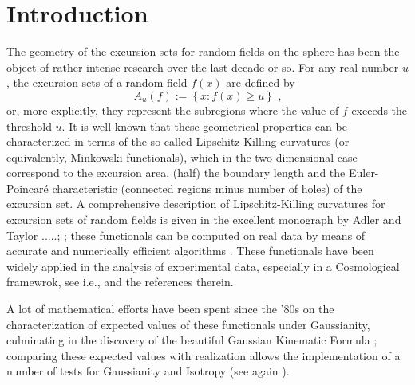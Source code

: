 \documentclass[aps,prd,showpacs,superscriptaddress,groupedaddress]{revtex4-1}  %
\begin{document}
\section{Introduction}

The geometry of the excursion sets for random fields on the sphere has been the object of rather intense research over the last decade or so. For any real number $u$, the excursion sets of a random field $f(x)$ are defined by%
\begin{equation}
A_{u}(f):=\left\{ x:f(x) \geq u\right\} \text{ ,}
\end{equation}
or, more explicitly, they represent the subregions where the value of $f$ exceeds the threshold $u$. It is well-known that these geometrical properties can be characterized in terms of the so-called Lipschitz-Killing curvatures (or equivalently, Minkowski functionals), which in the two dimensional case correspond to the excursion area, (half) the boundary length and the Euler-Poincar\'e characteristic (connected regions minus number of holes) of the excursion set. A comprehensive description of Lipschitz-Killing curvatures for excursion sets of random fields is given in the excellent monograph by Adler and Taylor .....; ; these functionals can be computed on real data by means of
accurate and numerically efficient algorithms \cite{KLENK2006127, Guderlei2007, Gay2012_NGPeaks}. These functionals have been widely applied in the analysis of experimental data, especially in a Cosmological framewrok, see i.e.,  \cite{natoli2010mfBoomrang, matsubara2010_mfFnl,
  ducout2013_mfFnl, gratten2012_mfLSSreview, munshi2013_mfSkewCl,planck2013_IS, planck2014-a18} and the references therein.


A lot of mathematical efforts have been spent since the '80s on the characterization of expected values of these functionals under Gaussianity, culminating in the discovery of the beautiful Gaussian Kinematic Formula \cite{TaylorAdler2009}; comparing these expected values with realization allows the implementation of a number of tests for Gaussianity and Isotropy (see again \cite{planck2013-p09, planck2014-a18}).
\end{document}
